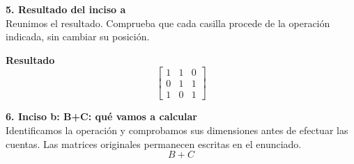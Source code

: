 \documentclass[11pt,a4paper,landscape]{article}
\begin{document}
\noindent\begin{minipage}{\linewidth}\textbf{5. Resultado del inciso a}\\[2pt]Reunimos el resultado. Comprueba que cada casilla procede de la operación indicada, sin cambiar su posición.
\par\smallskip \textbf{Resultado}\[\begin{bmatrix}1 & 1 & 0\\0 & 1 & 1\\1 & 0 & 1\end{bmatrix}\]
\end{minipage}\par\medskip
\noindent\begin{minipage}{\linewidth}\textbf{6. Inciso b: B+C: qué vamos a calcular}\\[2pt]Identificamos la operación y comprobamos sus dimensiones antes de efectuar las cuentas. Las matrices originales permanecen escritas en el enunciado.
\[B+C\]
\end{minipage}\par\medskip
\end{document}
